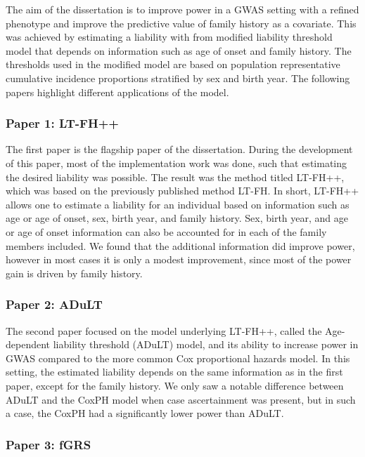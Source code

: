 The aim of the dissertation is to improve power in a GWAS setting with a refined phenotype and improve the predictive value of family history as a covariate. This was achieved by estimating a liability with from modified liability threshold model that depends on information such as age of onset and family history. The thresholds used in the modified model are based on population representative cumulative incidence proportions stratified by sex and birth year. The following papers highlight different applications of the model.


\subsubsection{Paper 1: LT-FH++}
The first paper is the flagship paper of the dissertation. During the development of this paper, most of the implementation work was done, such that estimating the desired liability was possible. The result was the method titled LT-FH++, which was based on the previously published method LT-FH. In short, LT-FH++ allows one to estimate a liability for an individual based on information such as age or age of onset, sex, birth year, and family history. Sex, birth year, and age or age of onset information can also be accounted for in each of the family members included. We found that the additional information did improve power, however in most cases it is only a modest improvement, since most of the power gain is driven by family history.

\subsubsection{Paper 2: ADuLT}
The second paper focused on the model underlying LT-FH++, called the Age-dependent liability threshold (ADuLT) model, and its ability to increase power in GWAS compared to the more common Cox proportional hazards model. In this setting, the estimated liability depends on the same information as in the first paper, except for the family history. We only saw a notable difference between ADuLT and the CoxPH model when case ascertainment was present, but in such a case, the CoxPH had a significantly lower power than ADuLT.

\subsubsection{Paper 3: fGRS}
